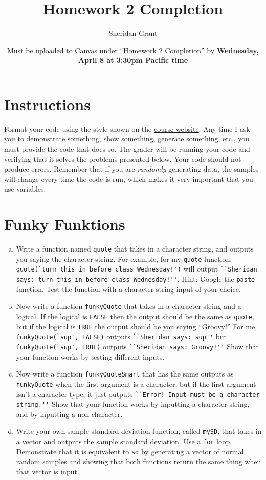 \documentclass[12pt]{article}
\title{Homework 2 Completion}
\author{Sheridan Grant}
\date{Must be uploaded to Canvas under ``Homework 2 Completion'' by \textbf{Wednesday, April 8 at 3:30pm Pacific time}}
\begin{document}
\sloppy

\maketitle

\section*{Instructions}

Format your code using the style shown on the \href{https://sheridanlgrant.github.io/teaching/STAT302_SPR2020}{course website}. Any time I ask you to demonstrate something, show something, generate something, etc., you must provide the code that does so. The grader will be running your code and verifying that it solves the problems presented below. Your code should not produce errors. Remember that if you are \textit{randomly} generating data, the samples will change every time the code is run, which makes it very important that you use variables.

\section{Funky Funktions}

\begin{enumerate}[(a)]
	\item Write a function named \verb|quote| that takes in a character string, and outputs you saying the character string. For example, for my \verb|quote| function, \verb|quote(`turn this in before class Wednesday!')| will output \verb|``Sheridan says: turn this in before class Wednesday!''|. Hint: Google the \verb|paste| function. Test the function with a character string input of your choice.
	\item Now write a function \verb|funkyQuote| that takes in a character string and a logical. If the logical is \verb|FALSE| then the output should be the same as \verb|quote|, but if the logical is \verb|TRUE| the output should be you saying ``Groovy!'' For me, \verb|funkyQuote(`sup', FALSE)| outputs \verb|``Sheridan says: sup''| but \verb|funkyQuote(`sup', TRUE)| outputs \verb|``Sheridan says: Groovy!''| Show that your function works by testing different inputs.
	\item Now write a function \verb|funkyQuoteSmart| that has the same outputs as \verb|funkyQuote| when the first argument is a character, but if the first argument isn't a character type, it just outputs \verb|``Error! Input must be a character string.''| Show that your function works by inputting a character string, and by inputting a non-character.
	\item Write your own sample standard deviation function, called \verb|mySD|, that takes in a vector and outputs the sample standard deviation. Use a \verb|for| loop. Demonstrate that it is equivalent to \verb|sd| by generating a vector of normal random samples and showing that both functions return the same thing when that vector is input.
\end{enumerate}
\end{document}
